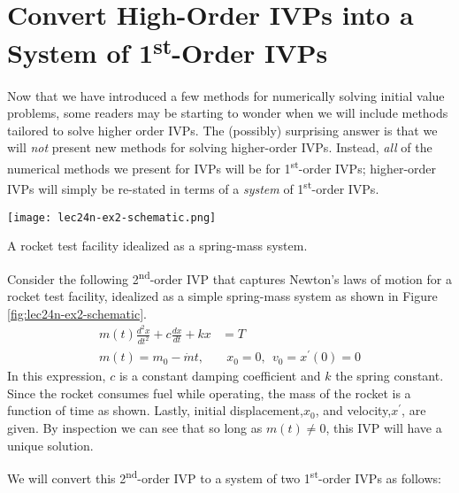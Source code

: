 \section{Convert High-Order IVPs into a System of 1\textsuperscript{st}-Order IVPs}
Now that we have introduced a few methods for numerically solving initial value problems, some readers may be starting to wonder when we will include methods tailored to solve higher order IVPs.  The (possibly) surprising answer is that we will \emph{not} present new methods for solving higher-order IVPs.  Instead, \emph{all} of the numerical methods we present for IVPs will be for 1\textsuperscript{st}-order IVPs; higher-order IVPs will simply be re-stated in terms of a \emph{system} of 1\textsuperscript{st}-order IVPs.
\begin{marginfigure}
\texttt{[image: lec24n-ex2-schematic.png]}
\caption{A rocket test facility idealized as a spring-mass system.}
\label{fig:lec24n-ex2-schematic}
\end{marginfigure}
Consider the following 2\textsuperscript{nd}-order IVP that captures Newton's laws of motion for a rocket test facility, idealized as a simple spring-mass system as shown in Figure \ref{fig:lec24n-ex2-schematic}.
\begin{align*}
m(t)\frac{d^2x}{dt^2}+c\frac{dx}{dt} + kx &= T \\
m(t) = m_0-\dot{m}t, & \ \ x_0 = 0, \ \ v_0 = x^{\prime}(0) = 0
\end{align*}
In this expression, $c$ is a constant damping coefficient and $k$ the spring constant.  Since the rocket consumes fuel while operating, the mass of the rocket is a function of time as shown.  Lastly, initial displacement,$x_0$, and velocity,$x^{\prime}$, are given. By inspection we can see that so long as $m(t) \ne 0$, this IVP will have a unique solution. 

\noindent We will convert this 2\textsuperscript{nd}-order IVP to a system of two 1\textsuperscript{st}-order IVPs as follows:

